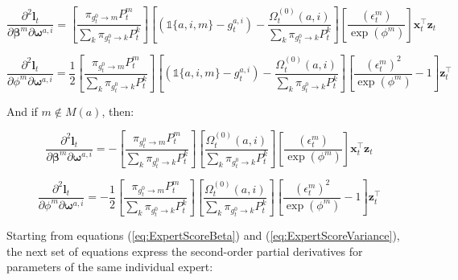 \documentclass[12pt]{article}
\newcommand{\gateprod}[2]{\pi_{#1 \longrightarrow #2}}
\theoremstyle{definition}
\begin{document}
\begin{equation} 
  \frac{\partial^{2} \boldsymbol{l}_{t}}{\partial \boldsymbol{\beta}^{m} \partial \boldsymbol{\omega}^{a, i}} =  \left[ \frac{\gateprod{g^{0}_{t}}{m} P^{m}_{t}}{ \sum_{k} \gateprod{g^{0}_{t}}{k} P^{k}_{t}} \right]  \left[ \left( \mathbb{1}\{a, i, m\} - g^{a, i}_{t} \right)  - \frac{ \Omega^{(0)}_{t}(a, i) }{ \sum_{k} \gateprod{g^{0}_{t}}{k} P^{k}_{t} }  \right] \left[ \frac{ (\epsilon^{m}_{t}) }{\exp(\phi^{m})} \right] \boldsymbol{x}_{t}^{\top} \boldsymbol{z}_{t}  
\end{equation}

\begin{equation} 
  \frac{\partial^{2} \boldsymbol{l}_{t}}{\partial \phi^{m} \partial \boldsymbol{\omega}^{a, i}} =  \frac{1}{2} \left[ \frac{\gateprod{g^{0}_{t}}{m} P^{m}_{t}}{ \sum_{k} \gateprod{g^{0}_{t}}{k} P^{k}_{t}} \right]  \left[ \left( \mathbb{1}\{a, i, m\} - g^{a, i}_{t} \right)  - \frac{ \Omega^{(0)}_{t}(a, i) }{ \sum_{k} \gateprod{g^{0}_{t}}{k} P^{k}_{t} }  \right] \left[ \frac{ (\epsilon^{m}_{t})^{2} }{\exp(\phi^{m})} - 1 \right] \boldsymbol{z}_{t}^{\top} 
\end{equation}

And if $m \not\in M(a)$, then:

\begin{equation} 
  \frac{\partial^{2} \boldsymbol{l}_{t}}{\partial \boldsymbol{\beta}^{m} \partial \boldsymbol{\omega}^{a, i}} =  - \left[ \frac{\gateprod{g^{0}_{t}}{m} P^{m}_{t}}{ \sum_{k} \gateprod{g^{0}_{t}}{k} P^{k}_{t}} \right]  \left[ \frac{ \Omega^{(0)}_{t}(a, i) }{ \sum_{k} \gateprod{g^{0}_{t}}{k} P^{k}_{t} }  \right] \left[ \frac{ (\epsilon^{m}_{t}) }{\exp(\phi^{m})} \right] \boldsymbol{x}_{t}^{\top} \boldsymbol{z}_{t}  
\end{equation}

\begin{equation} 
  \frac{\partial^{2} \boldsymbol{l}_{t}}{\partial \phi^{m} \partial \boldsymbol{\omega}^{a, i}} =  - \frac{1}{2} \left[ \frac{\gateprod{g^{0}_{t}}{m} P^{m}_{t}}{ \sum_{k} \gateprod{g^{0}_{t}}{k} P^{k}_{t}} \right]  \left[ \frac{ \Omega^{(0)}_{t}(a, i) }{ \sum_{k} \gateprod{g^{0}_{t}}{k} P^{k}_{t} }  \right] \left[ \frac{ (\epsilon^{m}_{t})^{2} }{\exp(\phi^{m})} - 1 \right] \boldsymbol{z}_{t}^{\top} 
\end{equation}

Starting from equations (\ref{eq:ExpertScoreBeta}) and (\ref{eq:ExpertScoreVariance}), the next set of equations express the second-order partial derivatives for parameters of the same individual expert:
\end{document}
